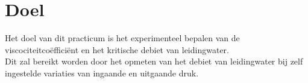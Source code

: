 \section{Doel}

Het doel van dit practicum is het experimenteel bepalen van de viscociteitco\"effici\"ent 
en het kritische debiet van leidingwater. \\

Dit zal bereikt worden door het opmeten van het debiet van 
leidingwater bij zelf ingestelde variaties van ingaande en uitgaande 
druk. 
